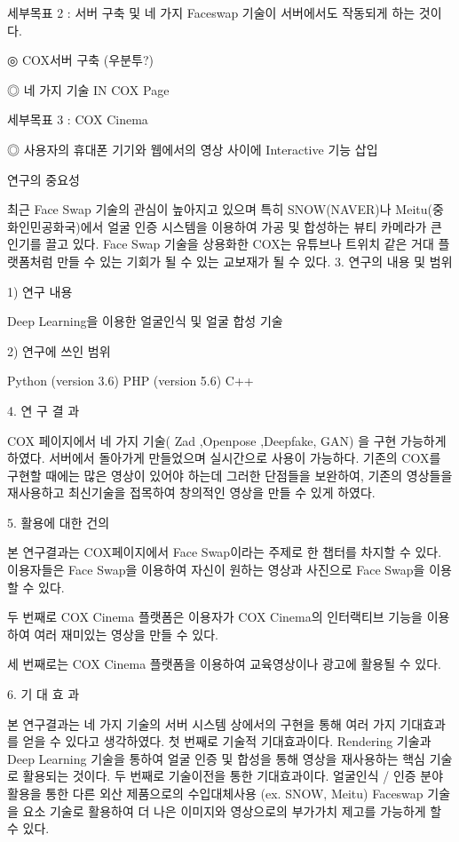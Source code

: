 \documentclass{oblivoir}
\begin{document}
세부목표 2 : 서버 구축 및 네 가지 Faceswap 기술이 서버에서도 작동되게 하는 것이다.

◎ COX서버 구축 (우분투?)

◎ 네 가지 기술 IN COX Page

세부목표 3 : COX Cinema 

◎ 사용자의 휴대폰 기기와 웹에서의 영상 사이에 Interactive 기능 삽입

연구의 중요성

최근 Face Swap 기술의 관심이 높아지고 있으며 특히 SNOW(NAVER)나 Meitu(중화인민공화국)에서 얼굴 인증 시스템을 이용하여 가공 및 합성하는 뷰티 카메라가 큰 인기를 끌고 있다. Face Swap 기술을 상용화한 COX는 유튜브나 트위치 같은 거대 플랫폼처럼 만들 수 있는 기회가 될 수 있는 교보재가 될 수 있다.
3. 연구의 내용 및 범위

1) 연구 
내용

Deep Learning을 이용한 얼굴인식 및 얼굴 합성 기술

2) 연구에 쓰인 범위

Python (version 3.6) 
PHP (version 5.6) 
C++

4. 연  구  결  과

COX 페이지에서 네 가지 기술( Zad ,Openpose ,Deepfake, GAN) 을 구현 가능하게 하였다. 서버에서 돌아가게 만들었으며 실시간으로 사용이 가능하다. 기존의 COX를 구현할 때에는 많은 영상이 있어야 하는데 그러한 단점들을 보완하여, 기존의 영상들을 재사용하고 최신기술을 접목하여 창의적인 영상을 만들 수 있게 하였다.


5. 활용에 대한 건의

본 연구결과는 COX페이지에서 Face Swap이라는 주제로 한 챕터를 차지할 수 있다. 이용자들은 Face Swap을 이용하여 자신이 원하는 영상과 사진으로 Face Swap을 이용할 수 있다.

두 번째로 COX Cinema 플랫폼은 이용자가 COX Cinema의 인터랙티브 기능을 이용하여 여러 재미있는 영상을 만들 수 있다. 

세 번째로는 COX Cinema 플랫폼을 이용하여 교육영상이나 광고에 활용될 수 있다.


6. 기  대  효  과

본 연구결과는 네 가지 기술의 서버 시스템 상에서의 구현을 통해 여러 가지 기대효과를 얻을 수 있다고 생각하였다. 첫 번째로 기술적 기대효과이다. Rendering 기술과 Deep Learning 기술을 통하여 얼굴 인증 및 합성을 통해 영상을 재사용하는 핵심 기술로 활용되는 것이다.
두 번째로 기술이전을 통한 기대효과이다. 얼굴인식 / 인증 분야 활용을 통한 다른 외산 제품으로의 수입대체사용 (ex. SNOW, Meitu) Faceswap 기술을 요소 기술로 활용하여 더 나은 이미지와 영상으로의 부가가치 제고를 가능하게 할 수 있다.
\end{document}
